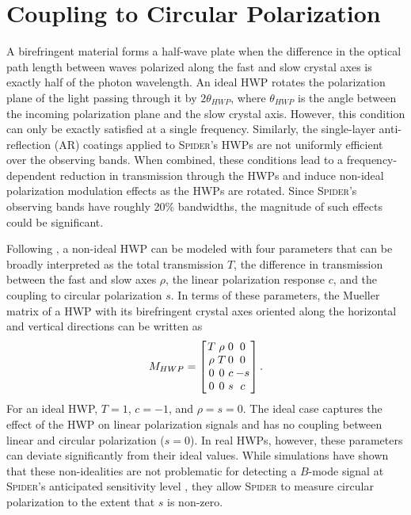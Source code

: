 \documentclass[twocolumn]{aastex61}
\begin{document}
\section{Coupling to Circular Polarization}
A birefringent material forms a half-wave plate when the difference in the optical path length between waves polarized along the fast and slow crystal axes is exactly half of the photon wavelength.  An ideal HWP rotates the polarization plane of the light passing through it by $2\theta_{HWP}$, where $\theta_{HWP}$ is the angle between the incoming polarization plane and the slow crystal axis.  However, this condition can only be exactly satisfied at a single frequency.  Similarly, the single-layer anti-reflection (AR) coatings applied to \textsc{Spider}'s HWPs are not uniformly efficient over the observing bands.  When combined, these conditions lead to a frequency-dependent reduction in transmission through the HWPs and induce non-ideal polarization modulation effects as the HWPs are rotated.   Since \textsc{Spider}'s observing bands have roughly 20\% bandwidths, the magnitude of such effects could be significant. 

Following \citet{bryan2010modeling}, a non-ideal HWP can be modeled with four parameters that can be broadly interpreted as the total transmission $T$, the difference in transmission between the fast and slow axes $\rho$, the linear polarization response $c$, and the coupling to circular polarization $s$.  In terms of these parameters, the Mueller matrix of a HWP with its birefringent crystal axes oriented along the horizontal and vertical directions can be written as
\begin{equation}\label{m_hwp}\arraycolsep=1.0pt\def\arraystretch{1.0}
M_{HWP} = \left[ \begin{array}{cccc} T & \rho & 0 & 0 \\ \rho & T & 0 & 0  \\ 0 & 0 & c & -s \\ 0 & 0 & s & c \end{array} \right].
\end{equation} 
For an ideal HWP, $T=1$, $c=-1$, and $\rho=s=0$.  The ideal case captures the effect of the HWP on linear polarization signals and has no coupling between linear and circular polarization ($s = 0$).  In real HWPs, however, these parameters can deviate significantly from their ideal values. While simulations have shown that these non-idealities are not problematic for detecting a $B$-mode signal at \textsc{Spider'}s anticipated sensitivity level \citep{Spider_odea}, they allow \textsc{Spider} to measure circular polarization to the extent that $s$ is non-zero.
\end{document}
